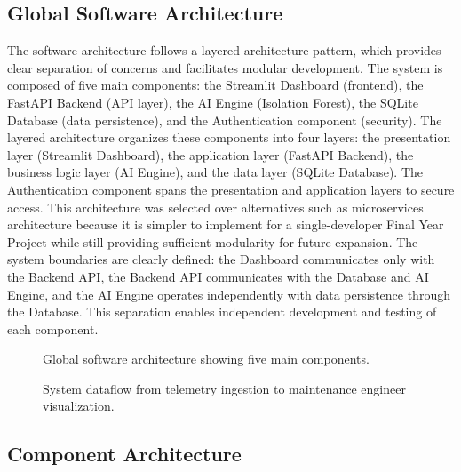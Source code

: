 \subsection{Global Software Architecture}

The software architecture follows a layered architecture pattern, which provides clear separation of concerns and facilitates modular development. The system is composed of five main components: the Streamlit Dashboard (frontend), the FastAPI Backend (API layer), the AI Engine (Isolation Forest), the SQLite Database (data persistence), and the Authentication component (security). The layered architecture organizes these components into four layers: the presentation layer (Streamlit Dashboard), the application layer (FastAPI Backend), the business logic layer (AI Engine), and the data layer (SQLite Database). The Authentication component spans the presentation and application layers to secure access. This architecture was selected over alternatives such as microservices architecture because it is simpler to implement for a single-developer Final Year Project while still providing sufficient modularity for future expansion. The system boundaries are clearly defined: the Dashboard communicates only with the Backend API, the Backend API communicates with the Database and AI Engine, and the AI Engine operates independently with data persistence through the Database. This separation enables independent development and testing of each component.

\begin{figure}[H]
\centering
\caption{Global software architecture showing five main components.}
\label{fig:global_architecture}
\end{figure}

\begin{figure}[H]
\centering
\caption{System dataflow from telemetry ingestion to maintenance engineer visualization.}
\label{fig:system_dataflow}
\end{figure}

\subsection{Component Architecture}

